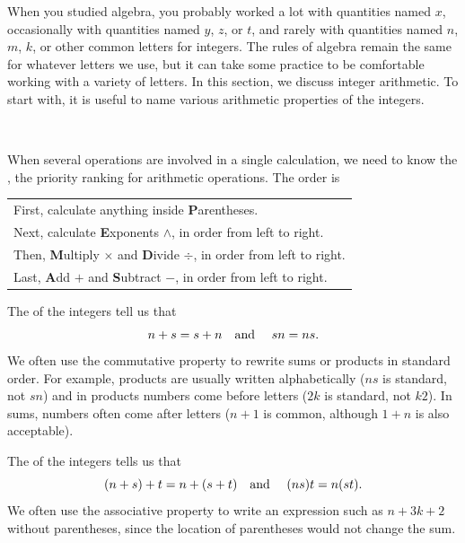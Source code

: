 When you studied algebra, you probably worked a lot with quantities named $x$, occasionally with quantities named $y$, $z$, or $t$, and rarely with quantities named $n$, $m$, $k$, or other common letters for integers. The rules of algebra remain the same for whatever letters we use, but it can take some practice to be comfortable working with a variety of letters. In this section, we discuss integer arithmetic. To start with, it is useful to name various arithmetic properties of the integers. 

\begin{defn} 
\label{defn_integer_algebra_order_operations}
    ~
    \begin{apart}
       \item \label{part_order_operations} When several operations are involved in a single calculation, we need to know the , the priority ranking for arithmetic operations.  The order is

\begin{center}
\begin{tabular} {l}
First, calculate anything inside \textbf{P}arentheses. \\ %
Next, calculate \textbf{E}xponents $\wedge$, in order from left to right. \\
Then, \textbf{M}ultiply $\times$ and \textbf{D}ivide $\div$, in order from left to right.\\
Last, \textbf{A}dd $+$ and \textbf{S}ubtract $-$, in order from left to right. \\ 
\end{tabular}
\end{center}

       \item The  of the integers tell us that 
           $$n+s=s+n \text{\quad and \quad} sn=ns.$$
        We often use the commutative property to rewrite sums or products in standard order.  For example, products are usually written alphabetically ($ns$ is standard, not $sn$) and in products numbers come before letters ($2k$ is standard, not $k2$). In sums, numbers often come after letters ($n+1$ is common, although $1+n$ is also acceptable).
       
       \item The  of the integers tells us that 
           $$(n+s)+t = n+(s+t) \text{\quad and \quad} (ns)t = n(st).$$ 
        We often use the associative property to write an expression such as $n+3k+2$ without parentheses, since the location of parentheses would not change the sum. 
       

\end{apart}
\end{defn}
